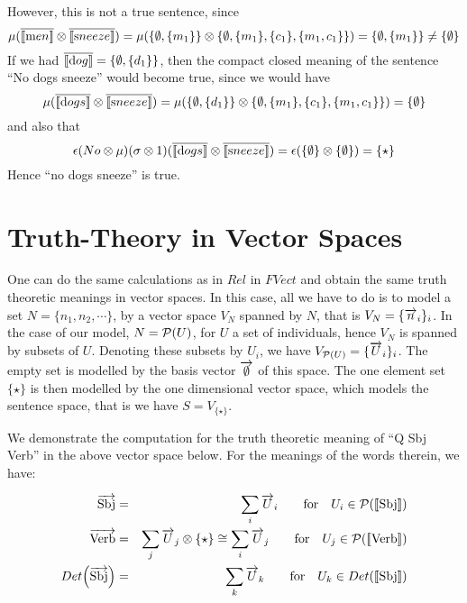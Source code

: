 \noindent
However, this is not a true sentence, since  
\[
\mu(\overline{[\![ \text men ]\!]} \otimes \overline{[\![ \text sneeze ]\!]}) = \mu(\{\emptyset, \{m_1\}\} \otimes \{\emptyset, \{m_1\}, \{c_1\}, \{m_1, c_1\}\}) = \{\emptyset, \{m_1\}\}   \neq \{\emptyset\}
\]
 If we had $\overline{[\![ \text dog ]\!]} = \{\emptyset, \{d_1\}\}$, then the compact closed meaning of the sentence ``No dogs sneeze''  would become true, since we would have
\[
\mu(\overline{[\![ \text dogs ]\!]} \otimes \overline{[\![ \text sneeze ]\!]}) = \mu(\{\emptyset, \{d_1\}\} \otimes \{\emptyset, \{m_1\}, \{c_1\}, \{m_1, c_1\}\}) = \{\emptyset\}
\]
and also that  
\[
\epsilon(No \otimes \mu)(\sigma \otimes 1) (\overline{[\![ \text dogs ]\!]} \otimes \overline{[\![ \text sneeze ]\!]})=  \epsilon(\{\emptyset\}  \otimes \{\emptyset\}) = \{\star\}
\]
Hence ``no dogs sneeze'' is true. 

\section{Truth-Theory in Vector Spaces} 

One can do the same calculations as in $Rel$ in $FVect$ and obtain the same truth theoretic meanings in vector spaces. In this case, all we have to do is to model a set $N = \{n_1, n_2, \cdots\}$, by a vector space $V_N$ spanned by $N$, that is $V_N = \{\overrightarrow{n}_i\}_i$. In the case of our model, $N = {\cal P}(U)$, for $U$ a set of individuals, hence $V_N$ is spanned by subsets of $U$.  Denoting these subsets by $U_i$, we have $V_{{\cal P}(U)} = \{\overrightarrow{U}_i\}_i$. The  empty set is modelled by  the basis vector $\overrightarrow{\emptyset}$ of this space. The one element set $\{\star\}$ is then modelled  by the one dimensional vector space, which  models the sentence space, that is we have $S =  V_{\{\star\}}$.  

We demonstrate the computation for the truth theoretic meaning of ``Q Sbj Verb'' in the above vector space below. For the meanings of the words therein, we have:

\begin{eqnarray*}
\overrightarrow{\text{Sbj}} &=& \sum_i \overrightarrow{U}_i \qquad \text{for} \quad U_i \in {\cal P}([\![ \text{Sbj} ]\!])\\
\overrightarrow{\text{Verb}} &=& \sum_j \overrightarrow{U}_j  \otimes \{\star\} \cong \sum_i \overrightarrow{U}_j  \qquad \text{for} \quad  U_j \in {\cal P}([\![ \text{Verb} ]\!])\\
Det\Big(\overrightarrow{\text{Sbj}}\Big) &=& \sum_k \overrightarrow{U}_k \qquad \text{for} \quad   U_k \in Det([\![ \text{Sbj} ]\!])
\end{eqnarray*}




